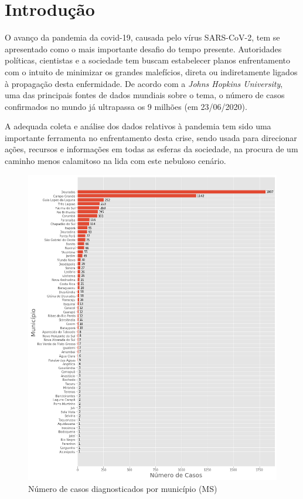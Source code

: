 \documentclass[12pt]{article}
\begin{document}
\section{Introdução}

O avanço da pandemia da covid-19, causada pelo vírus SARS-CoV-2, tem se apresentado como o mais importante desafio do tempo presente. Autoridades políticas, cientistas e a sociedade tem buscam estabelecer planos enfrentamento com o intuito de minimizar os grandes malefícios, direta ou indiretamente ligados à propagação desta enfermidade. De acordo com a \textit{Johns Hopkins University}, uma das principais fontes de dados mundiais sobre o tema, o número de casos confirmados no mundo já ultrapassa os 9 milhões (em 23/06/2020).

A adequada coleta e análise dos dados relativos à pandemia tem sido uma importante ferramenta no enfrentamento desta crise, sendo usada para direcionar ações, recursos e informações em todas as esferas da sociedade, na procura de um caminho menos calamitoso na lida com este nebuloso cenário.

\begin{figure}[!htb]
  \centering
  \includegraphics[width=1\textwidth]{figs/casos_por_municipio.png}
  \caption{Número de casos diagnosticados por município (MS)}
  \label{fig:casosMuni}
  \end{figure}
\end{document}
